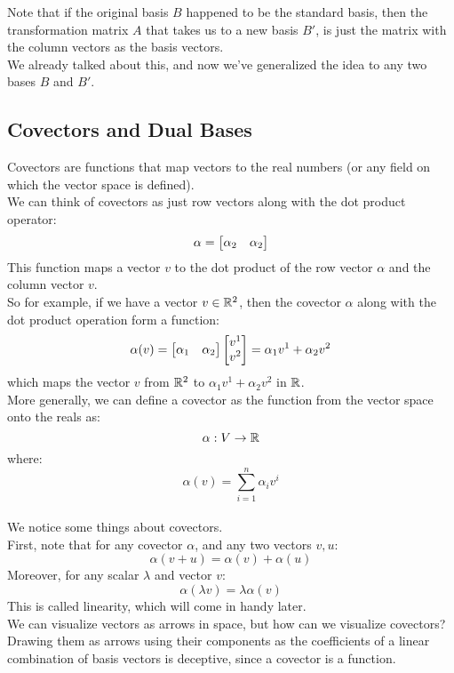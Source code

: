 \documentclass[12pt]{article}
\begin{document}
Note that if the original basis $B$ happened
to be the standard basis, then the
transformation matrix $A$
that takes us to a new basis $B'$,
is just the matrix with the column vectors
as the basis vectors. \\
We already talked about this,
and now we've generalized the idea
to any two bases $B$ and $B'$. \\

\newpage

\subsection*{Covectors and Dual Bases}

Covectors are functions
that map vectors to the real numbers
(or any field on which the vector space
is defined). \\

We can think of covectors as just row vectors
along with the dot product operator:
\[ \alpha = \begin{bmatrix} \alpha_2 & \alpha_2 \end{bmatrix} \]
This function maps a vector $v$
to the dot product of the row vector $\alpha$
and the column vector $v$. \\

So for example, if we have a vector $v \in \mathbb{R}^2$,
then the covector $\alpha$ along with the dot product
operation form a function:
\[ \alpha(v) =
\begin{bmatrix} \alpha_1 & \alpha_2 \end{bmatrix}
\begin{bmatrix} v^1 \\ v^2 \end{bmatrix} = \alpha_1v^1 + \alpha_2v^2 \]
which maps the vector $v$ from $\mathbb{R}^2$
to $\alpha_1v^1 + \alpha_2v^2$ in $\mathbb{R}$. \\

More generally, we can define a covector
as the function from the vector space
onto the reals as:
\[ \alpha: V \to \mathbb{R} \]
where:
\[ \alpha(v) = \sum_{i = 1}^{n} \alpha_iv^i \] \\

We notice some things about covectors. \\
First, note that for any covector $\alpha$,
and any two vectors $v, u$:
\[ \alpha(v + u) = \alpha(v) + \alpha(u) \]
Moreover, for any scalar $\lambda$
and vector $v$:
\[ \alpha(\lambda v) = \lambda \alpha(v) \]
This is called linearity,
which will come in handy later. \\

We can visualize vectors as arrows in space,
but how can we visualize covectors?
Drawing them as arrows using their components
as the coefficients of a linear combination
of basis vectors is deceptive,
since a covector is a function. \\
\end{document}
